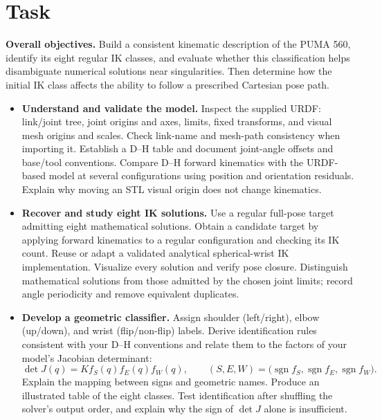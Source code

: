 \documentclass[11pt,a4paper]{article}
\begin{document}
\section*{Task}
\textbf{Overall objectives.} Build a consistent kinematic description of the PUMA
560, identify its eight regular IK classes, and evaluate whether this classification
helps disambiguate numerical solutions near singularities. Then determine how the
initial IK class affects the ability to follow a prescribed Cartesian pose path.

\begin{itemize}
  \item \textbf{Understand and validate the model.}
  Inspect the supplied URDF: link/joint tree, joint origins and axes, limits,
  fixed transforms, and visual mesh origins and scales. Check link-name and mesh-path
  consistency when importing it. Establish a D--H table and document joint-angle
  offsets and base/tool conventions. Compare D--H forward kinematics with the
  URDF-based model at several configurations using position and orientation
  residuals. Explain why moving an STL visual origin does not change kinematics.

  \item \textbf{Recover and study eight IK solutions.}
  Use a regular full-pose target admitting eight mathematical solutions. Obtain
  a candidate target by applying forward kinematics to a regular configuration
  and checking its IK count. Reuse or adapt a validated analytical
  spherical-wrist IK implementation. Visualize every solution and verify pose
  closure. Distinguish mathematical solutions from those admitted by the chosen
  joint limits; record angle periodicity and remove equivalent duplicates.

  \item \textbf{Develop a geometric classifier.}
  Assign shoulder (left/right), elbow (up/down), and wrist (flip/non-flip) labels.
  Derive identification rules consistent with your D--H conventions and relate
  them to the factors of your model's Jacobian determinant:
  \[
    \det J(q)=K f_S(q)f_E(q)f_W(q),\qquad
    (S,E,W)=\bigl(\operatorname{sgn}f_S,
    \operatorname{sgn}f_E,\operatorname{sgn}f_W\bigr).
  \]
  Explain the mapping between signs and geometric names. Produce an illustrated
  table of the eight classes. Test identification after shuffling the solver's
  output order, and explain why the sign of $\det J$ alone is insufficient.


\end{itemize}
\end{document}
